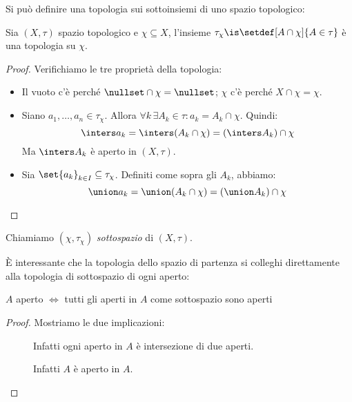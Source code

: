 

Si può definire una topologia sui sottoinsiemi di uno spazio topologico:

\begin{prop}
	Sia $(X,\tau)$ spazio topologico e $\chi\subseteq X$, l'insieme
	$\tau_\chi\is\setdef[A\cap\chi]{A\in\tau}$
	è una topologia su $\chi$.
\end{prop}

\begin{proof}
	Verifichiamo le tre proprietà della topologia:
	\begin{itemize}
		\item Il vuoto c'è perché $\nullset\cap\chi=\nullset$;
		$\chi$ c'è perché $X\cap\chi=\chi$.
		\item Siano $a_1,\ldots,a_n\in\tau_\chi$.
		Allora $\forall k\,\exists A_k\in\tau:a_k=A_k\cap\chi$.
		Quindi:
		\[\inters a_k=\inters(A_k\cap\chi)=\left(\inters A_k\right)\cap\chi\]
		Ma $\inters A_k$ è aperto in $(X,\tau)$.
		\item Sia $\set{a_k}_{k\in I}\subseteq\tau_\chi$.
		Definiti come sopra gli $A_k$, abbiamo:
		\[\union a_k=\union(A_k\cap\chi)=\left(\union A_k\right)\cap\chi \qedhere\]
	\end{itemize}
\end{proof}

\begin{defn}[Sottospazio]
	Chiamiamo $(\chi,\tau_\chi)$ \emph{sottospazio} di $(X,\tau)$.
\end{defn}

È interessante che la topologia dello spazio di partenza si colleghi direttamente alla topologia di sottospazio di ogni aperto:

\begin{prop}
	$A$ aperto $\iff$ tutti gli aperti in $A$ come sottospazio sono aperti
\end{prop}

\begin{proof}
	Mostriamo le due implicazioni:
	\begin{description}
		\item[\proofrightarrow]
		Infatti ogni aperto in $A$ è intersezione di due aperti.
		\item[\proofleftarrow]
		Infatti $A$ è aperto in $A$. \qedhere
	\end{description}
\end{proof}

